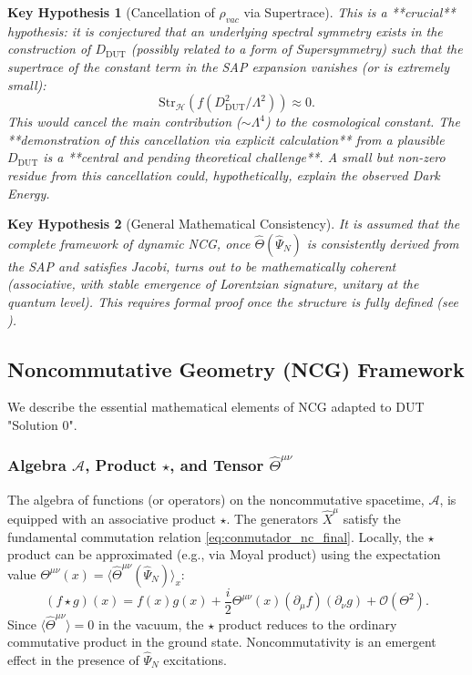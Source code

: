 \documentclass[11pt, a4paper]{article}
\newtheorem{hypothesis}{Key Hypothesis}[section]
\theoremstyle{remark}
\newcommand{\Op}[1]{\hat{#1}}
\newcommand{\Star}{\star}
\newcommand{\Str}{\mathrm{Str}}
\begin{document}
\begin{hypothesis}[Cancellation of \texorpdfstring{$\rho_{vac}$}{rho\_vac} via Supertrace]
    \label{hyp:cc_cancel_final}
    This is a **crucial** hypothesis: it is conjectured that an underlying spectral symmetry exists in the construction of \( D_{\text{DUT}} \) (possibly related to a form of Supersymmetry) such that the supertrace of the constant term in the SAP expansion vanishes (or is extremely small):
    \[ \Str_{\mathcal{H}}(f(D_{\text{DUT}}^2/\Lambda^2)) \approx 0. \]
    This would cancel the main contribution (\(\sim \Lambda^4\)) to the cosmological constant. The **demonstration of this cancellation via explicit calculation** from a plausible \( D_{\text{DUT}} \) is a **central and pending theoretical challenge**. A small but non-zero residue from this cancellation could, hypothetically, explain the observed Dark Energy.
\end{hypothesis}

\begin{hypothesis}[General Mathematical Consistency]
    \label{hyp:math_consistency_final}
    It is assumed that the complete framework of dynamic NCG, once \( \Op{\Theta}(\Op{\Psi}_N) \) is consistently derived from the SAP and satisfies Jacobi, turns out to be mathematically coherent (associative, with stable emergence of Lorentzian signature, unitary at the quantum level). This requires formal proof once the structure is fully defined (see ).
\end{hypothesis}

\subsection{Noncommutative Geometry (NCG) Framework}
\label{subsec:gnc_formalism_final}

We describe the essential mathematical elements of NCG adapted to DUT "Solution 0".

\subsubsection{Algebra \texorpdfstring{$\mathcal{A}$}{A}, Product \texorpdfstring{$\Star$}{Star}, and Tensor \texorpdfstring{$\Op{\Theta}^{\mu\nu}$}{Theta}}
\label{ssubsec:algebra_star_theta_final}
The algebra of functions (or operators) on the noncommutative spacetime, \( \mathcal{A} \), is equipped with an associative product \( \Star \). The generators \( \hat{X}^\mu \) satisfy the fundamental commutation relation \eqref{eq:conmutador_nc_final}. Locally, the \( \Star \) product can be approximated (e.g., via Moyal product) using the expectation value \( \Theta^{\mu\nu}(x) = \langle \Op{\Theta}^{\mu\nu}(\Op{\Psi}_N) \rangle_x \):
\begin{equation} \label{eq:moyal_product_explicit_final}
(f \Star g)(x) = f(x)g(x) + \frac{i}{2}\Theta^{\mu\nu}(x)(\partial_\mu f)(\partial_\nu g) + \mathcal{O}(\Theta^2).
\end{equation}
Since \( \langle \Op{\Theta}^{\mu\nu} \rangle = 0 \) in the vacuum, the \( \Star \) product reduces to the ordinary commutative product in the ground state. Noncommutativity is an emergent effect in the presence of \( \Op{\Psi}_N \) excitations.
\end{document}
